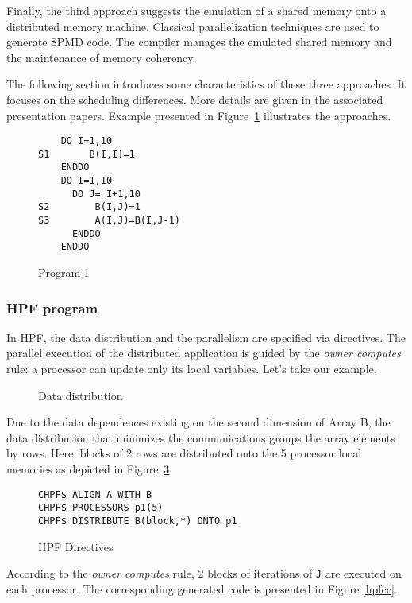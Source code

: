 Finally, the third approach  suggests the emulation of a shared memory onto a
distributed memory machine. Classical parallelization techniques are used
to generate SPMD code. The compiler manages the emulated shared memory and the maintenance of memory coherency.

The following section introduces some characteristics of  these three
 approaches. It focuses on the scheduling differences. More details are 
given   in the associated presentation papers.
 Example presented  in Figure~\ref{ex1} illustrates the approaches.


\begin{figure}[htp]
\begin{verbatim}
    DO I=1,10
S1       B(I,I)=1
    ENDDO
    DO I=1,10
      DO J= I+1,10
S2        B(I,J)=1
S3        A(I,J)=B(I,J-1)
      ENDDO
    ENDDO  
\end{verbatim}
\caption{Program 1}
\label{ex1}
\end{figure}

\subsubsection{HPF program}

In HPF, the  data distribution and the parallelism are specified
 via directives. The
parallel execution of the distributed application is guided by the {\it
owner computes} rule: a processor can update only its local variables. Let's take our example. 

\begin{figure}[htp]
\caption{Data distribution}
\label{hpfc}
\end{figure}

Due to the data dependences existing on the second dimension of Array B, 
the data distribution that minimizes
the communications groups the array elements by rows. Here,
 blocks of 2 rows are distributed onto the 5 processor local memories as 
depicted in Figure~\ref{direct}.

\begin{figure}[htp]
\begin{verbatim}
CHPF$ ALIGN A WITH B
CHPF$ PROCESSORS p1(5)
CHPF$ DISTRIBUTE B(block,*) ONTO p1
\end{verbatim}
\caption{ HPF Directives}
\label{direct}
\end{figure}

According to the {\it owner computes} rule,  2 blocks of
iterations of \verb+J+ are executed on each processor. The corresponding 
generated code is presented in Figure \ref{hpfcc}.

